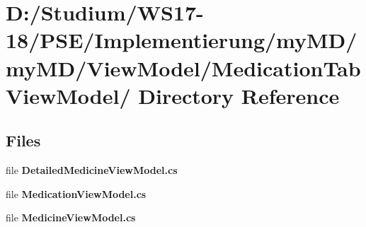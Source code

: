 \hypertarget{dir_D_3A_2FStudium_2FWS17_2D18_2FPSE_2FImplementierung_2FmyMD_2FmyMD_2FViewModel_2FMedicationTabViewModel_2F}{
\section{D:/Studium/WS17-18/PSE/Implementierung/my\-MD/my\-MD/View\-Model/Medication\-Tab\-View\-Model/ Directory Reference}
\label{dir_D_3A_2FStudium_2FWS17_2D18_2FPSE_2FImplementierung_2FmyMD_2FmyMD_2FViewModel_2FMedicationTabViewModel_2F}
}


\subsection*{Files}
\begin{CompactItemize}
\item 
file {\bf Detailed\-Medicine\-View\-Model.cs}
\item 
file {\bf Medication\-View\-Model.cs}
\item 
file {\bf Medicine\-View\-Model.cs}
\end{CompactItemize}
